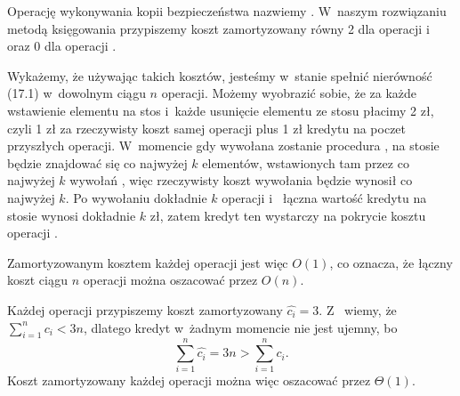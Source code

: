 
\exercise %
Operację wykonywania kopii bezpieczeństwa nazwiemy .
W~naszym rozwiązaniu metodą księgowania przypiszemy koszt zamortyzowany równy 2 dla operacji  i~ oraz 0 dla operacji .

Wykażemy, że używając takich kosztów, jesteśmy w~stanie spełnić nierówność (17.1) w~dowolnym ciągu $n$ operacji.
Możemy wyobrazić sobie, że za każde wstawienie elementu na stos i~każde usunięcie elementu ze stosu płacimy 2 zł, czyli 1 zł za rzeczywisty koszt samej operacji plus 1 zł kredytu na poczet przyszłych operacji.
W~momencie gdy wywołana zostanie procedura , na stosie będzie znajdować się co najwyżej $k$ elementów, wstawionych tam przez co najwyżej $k$ wywołań , więc rzeczywisty koszt wywołania  będzie wynosił co najwyżej $k$.
Po wywołaniu dokładnie $k$ operacji  i~ łączna wartość kredytu na stosie wynosi dokładnie $k$ zł, zatem kredyt ten wystarczy na pokrycie kosztu operacji .

Zamortyzowanym kosztem każdej operacji jest więc $O(1)$, co oznacza, że łączny koszt ciągu $n$ operacji można oszacować przez $O(n)$.

\exercise %
Każdej operacji przypiszemy koszt zamortyzowany $\widehat{c_i}=3$.
Z~ wiemy, że $\sum_{i=1}^nc_i<3n$, dlatego kredyt w~żadnym momencie nie jest ujemny, bo
\[
	\sum_{i=1}^n\widehat{c_i} = 3n > \sum_{i=1}^nc_i.
\]
Koszt zamortyzowany każdej operacji można więc oszacować przez $\Theta(1)$.

\exercise %

